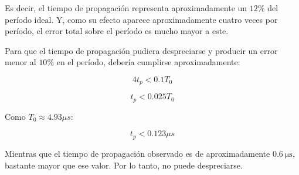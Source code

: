 Es decir, el tiempo de propagación representa aproximadamente un $12\%$ del
período ideal. Y, como su efecto aparece aproximadamente cuatro veces por
período, el error total sobre el período es mucho mayor a este.

Para que el tiempo de propagación pudiera despreciarse y producir un error menor
al $10\%$ en el período, debería cumplirse aproximadamente:

\begin{equation*}
    4t_p < 0.1T_0
\end{equation*}

\begin{equation*}
    t_p < 0.025T_0
\end{equation*}

Como $T_0 \approx 4.93\mu s$:

\begin{equation}
    t_p < 0.123\mu s
\end{equation}

Mientras que el tiempo de propagación observado es de aproximadamente
$\SI{0.6}{\micro\second}$, bastante mayor que ese valor. Por lo tanto, no puede despreciarse.
